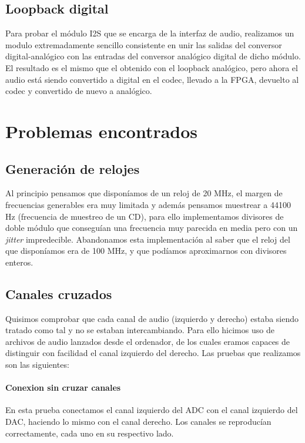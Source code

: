	\subsection{Loopback digital}
		
		Para probar el módulo I2S que se encarga de la interfaz de audio, realizamos un modulo extremadamente sencillo consistente en unir las salidas del conversor digital-analógico con las entradas del conversor analógico digital de dicho módulo. El resultado es el mismo que el obtenido con el loopback analógico, pero ahora el audio está siendo convertido a digital en el codec, llevado a la FPGA, devuelto al codec y convertido de nuevo a analógico.

		

	
\section{Problemas encontrados}


	\subsection{Generación de relojes}
		Al principio pensamos que disponíamos de un reloj de 20 MHz, el margen de frecuencias generables era muy limitada  y además pensamos muestrear a 44100 Hz (frecuencia de muestreo de un CD), para ello implementamos divisores de doble módulo \cite{Fraccional divider in VHDL} que conseguían una frecuencia muy parecida en media pero con un \emph{jitter} impredecible. Abandonamos esta implementación al saber que el reloj del que disponíamos era de 100 MHz, y que podíamos aproximarnos con divisores enteros.

	

	\subsection{Canales cruzados}

		Quisimos comprobar que cada canal de audio (izquierdo y derecho) estaba siendo tratado como tal y no se estaban intercambiando. Para ello hicimos uso de archivos de audio lanzados desde el ordenador, de los cuales eramos capaces de distinguir con facilidad el canal izquierdo del derecho. Las pruebas que realizamos son las siguientes:

		\paragraph{Conexion sin cruzar canales}
			En esta prueba conectamos el canal izquierdo del ADC con el canal izquierdo del DAC, haciendo lo mismo con el canal derecho. Los canales se reproducían correctamente, cada uno en su respectivo lado.


